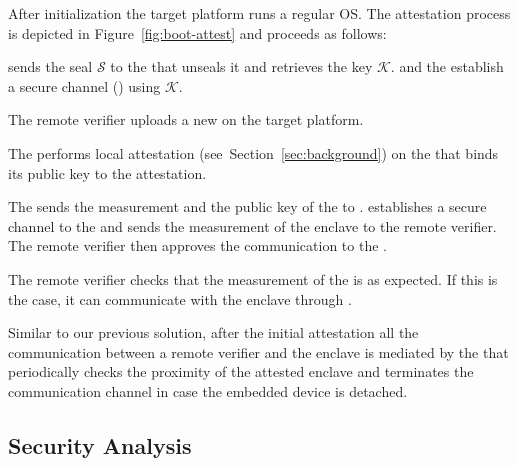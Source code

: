 After initialization the target platform runs a regular OS. The attestation process is depicted in Figure~\ref{fig:boot-attest} and proceeds as follows:

\begin{mylist}


  \item[\one] \device sends the seal $\mathcal{S}$ to the \nameclave that unseals it and retrieves the key $\mathcal{K}$. \device and the \nameclave establish a secure channel (\tls) using $\mathcal{K}$.

  \item[\two] The remote verifier uploads a new \app on the target platform.

  \item[\three] The \nameclave performs local attestation (see~Section~\ref{sec:background}) on the \app that binds its public key to the attestation. %

  \item[\four] The \nameclave sends the measurement and the public key of the \app to \device. \device establishes a secure channel to the \app and sends the measurement of the enclave to the remote verifier. The remote verifier then approves the communication to the \app.

  \item[\five] The remote verifier checks that the measurement of the \app is as expected. If this is the case, it can communicate with the enclave through \device.

\end{mylist}


Similar to our previous solution, after the initial attestation all the communication between a remote verifier and the enclave is mediated by the \device that periodically checks the proximity of the attested enclave and terminates the communication channel in case the embedded device is detached.


\subsection{Security Analysis}

